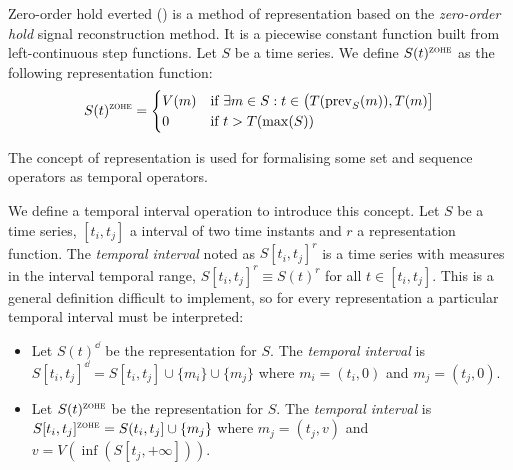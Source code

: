 \begin{definition}
  Zero-order hold everted (\zohe{}) is a method of representation
  based on the \emph{zero-order hold} signal reconstruction method. It
  is a piecewise constant function built from left-continuous step
  functions.  Let $S$ be a time series. We define $S(t)^\zohe$ as the
  following representation function:
  \[
  S(t)^\zohe 
  = \begin{cases}
    V(m) & \text{if } \exists m\in S: t\in \big(T(\prev_S(m)),T(m)\big]\\
    0    & \text{if } t > T(\max(S)) 
  \end{cases}
  \]
\end{definition}




The concept of representation is used for formalising some set and
sequence operators as temporal operators. 




We define a temporal interval operation to introduce this concept.
Let $S$ be a time series, $[t_i,t_j]$ a interval of two time instants
and $r$ a representation function. The \emph{temporal interval} noted
as $S[t_i,t_j]^r$ is a time series with measures in the interval
temporal range, $S[t_i,t_j]^r\equiv S(t)^r$ for all $t \in [t_i,t_j]$. This
is a general definition difficult to implement, so for every
representation a particular temporal interval must be interpreted:

\begin{itemize}
\item Let $S(t)^\dd$ be the \dd{} representation for $S$. The
  \emph{\dd{} temporal interval} is $S[t_i,t_j]^\dd = S[t_i,t_j]
  \cup \{m_i\} \cup \{m_j\}$ where $m_i=(t_i,0)$ and $m_j=(t_j,0)$.

\item Let $S(t)^\zohe{}$ be the \zohe{} representation for $S$. The
  \emph{\zohe{} temporal interval} is $S[t_i,t_j]^\zohe{} = S(t_i,t_j]
  \cup \{m_j\}$ where $m_j=(t_j,v)$ and $v= V(\inf( S[t_j,+\infty] ))$.
\end{itemize}




